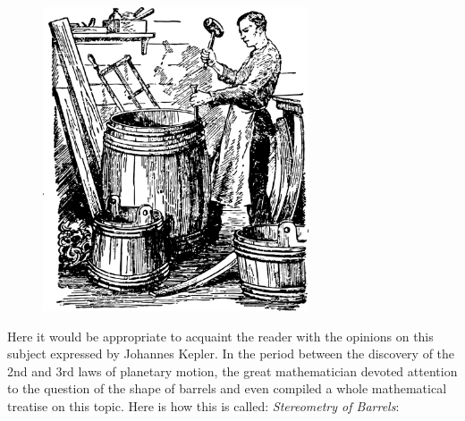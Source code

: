 \begin{figure}[h!]
\centering
\includegraphics[width=0.7\textwidth]{figures/ch-08/fig-110.pdf}
\end{figure}

Here it would be appropriate to acquaint the reader with the opinions on this subject expressed by Johannes Kepler. In the period between the discovery of the 2nd and 3rd laws of planetary motion, the great mathematician devoted attention to the question of the shape of barrels and even compiled a whole mathematical treatise on this topic. Here is how this is called: \emph{Stereometry of Barrels}: 

